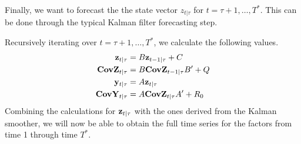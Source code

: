 \documentclass[11pt, letterpaper]{article}
\newcommand{\vv}[1]{\textcolor{black}{\mathbf{#1}}}
\begin{document}
Finally, we want to forecast the the state vector $z_{t|\tau}$ for $t = \tau + 1, \dots, T^*$. This can be done through the typical Kalman filter forecasting step.

Recursively iterating over $t = \tau + 1, \dots, T^*$, we calculate the following values.
\begin{align*}
	\vv{z}_{t|\tau} &= B \vv{z}_{t-1|\tau} + C\\
	\vv{CovZ}_{t|\tau} &= B \vv{CovZ}_{t-1|\tau} B'+ Q\\
	\vv{y}_{t|\tau} &= A \vv{z}_{t|\tau}\\
	\vv{CovY}_{t|\tau} &= A \vv{CovZ}_{t|\tau} A' + R_0
\end{align*}
Combining the calculations for $\vv{z}_{t|\tau}$ with the ones derived from the Kalman smoother, we will now be able to obtain the full time series for the factors from time 1 through time $T^*$.
\end{document}
